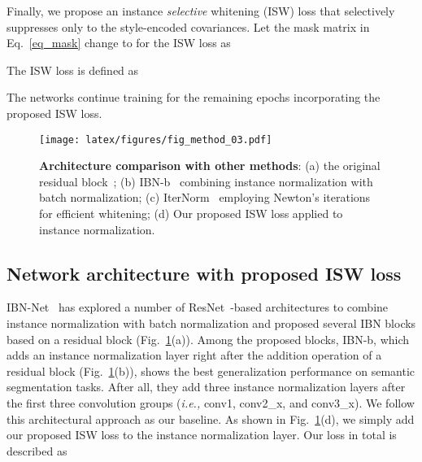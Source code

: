 \documentclass[final]{latex/cvpr}
\begin{document}
Finally, we propose an instance \emph{selective} whitening (ISW) loss that selectively suppresses only to the style-encoded covariances.
Let the mask matrix  in Eq.~\eqref{eq_mask} change to  for the ISW loss as
\vspace{-0.1cm}

The ISW loss is defined as
\vspace*{-0.05cm}

The networks continue training for the remaining epochs incorporating the proposed ISW loss.

\begin{figure}[b!]
\vspace{-0.3cm}
\begin{center}
  \texttt{[image: latex/figures/fig\_method\_03.pdf]}
\end{center}
\vspace*{-0.3cm}
   \caption{\textbf{Architecture comparison with other methods}: (a) the original residual block~\cite{he2016deep}; (b) IBN-b~\cite{pan2018two} combining instance normalization with batch normalization; (c) IterNorm~\cite{huang2019iterative} employing Newton's iterations for efficient whitening; (d) Our proposed ISW loss applied to instance normalization.
}
\label{fig:architectural_comparison}
\end{figure}

\vspace*{-0.0cm}
\subsection{Network architecture with proposed ISW loss}\label{sec:network_architecture}
\vspace*{-0.05cm}
IBN-Net~\cite{pan2018two} has explored a number of ResNet~\cite{he2016deep}-based architectures to combine instance normalization with batch normalization and proposed several IBN blocks based on a residual block (Fig.~\ref{fig:architectural_comparison}(a)). Among the proposed blocks, IBN-b, which adds an instance normalization layer right after the addition operation of a residual block (Fig.~\ref{fig:architectural_comparison}(b)), shows the best generalization performance on semantic segmentation tasks. After all, they add three instance normalization layers after the first three convolution groups (\textit{i.e.,} conv1, conv2\_x, and conv3\_x). We follow this architectural approach as our baseline. As shown in Fig.~\ref{fig:architectural_comparison}(d), we simply add our proposed ISW loss to the instance normalization layer.
Our loss in total is described as
\vspace{-0.25cm}
\end{document}
